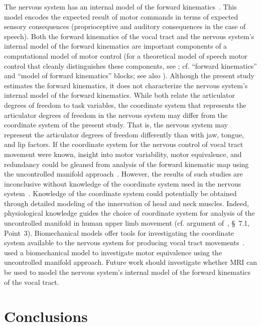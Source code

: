 \documentclass[preprint]{JASAnew}\usepackage[]{graphicx}\usepackage[]{color}
\begin{document}
The nervous system has an internal model of the forward kinematics~\citep{shadmehr2010error}. This model encodes the expected result of motor commands in terms of expected sensory consequences (proprioceptive and auditory consequences in the case of speech). 
%
Both the forward kinematics of the vocal tract and the nervous system's internal model of the forward kinematics are important components of a computational model of motor control  (for a theoretical model of speech motor control that cleanly distinguishes these components, see \citealt{Ramanarayanan+2016}; cf. ``forward kinematics'' and ``model of forward kinematics'' blocks; see also \citealt{houde2011speech,todorov2002optimal}). Although the present study estimates the forward kinematics, it does not characterize the nervous system's internal model of the forward kinematics. While both relate the articulator degrees of freedom to task variables, the coordinate system that represents the articulator degrees of freedom in the nervous system may differ from the coordinate system of the present study. That is, the nervous system may represent the articulator degrees of freedom differently than with jaw, tongue, and lip factors. If the coordinate system for the nervous control of vocal tract movement were known, insight into motor variability, motor equivalence, and redundancy could be gleaned from analysis of the forward kinematic map using the uncontrolled manifold approach~\cite{scholz1999uncontrolled}. However, the results of such studies are inconclusive without knowledge of the coordinate system used in the nervous system~\cite{sternad2010coordinate}. Knowledge of the coordinate system could potentially be obtained through detailed modeling of the innervation of head and neck muscles. Indeed, physiological knowledge guides the choice of coordinate system for analysis of the uncontrolled manifold in human upper limb movement (cf. argument of~\citealt{scholz2014use}, \S~7.1, Point~3).
Biomechanical models offer tools for investigating the coordinate system available to the nervous system for producing vocal tract movements~\cite{lloyd2012artisynth}. \citet{Szabados+2016} used a biomechanical model to investigate motor equivalence using the uncontrolled manifold approach. Future work should investigate whether MRI can be used to model the nervous system's internal model of the forward kinematics of the vocal tract. 






\section{Conclusions}
\label{sec:conclusions}
\end{document}
